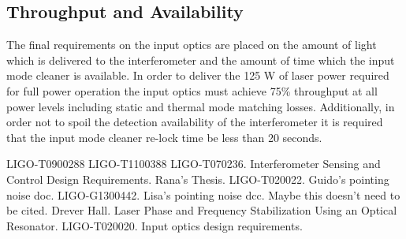 \documentclass[10pt]{article}
\begin{document}
\subsection{Throughput and Availability}
The final requirements on the input optics are placed on the amount of light which is delivered 
to the interferometer and the amount of time which the input mode cleaner is available.  
In order to deliver the 125 W of laser power required for full power operation the input optics 
must achieve 75\% throughput at all power levels including static and thermal mode matching losses.  
Additionally, in order not to spoil the detection availability of the interferometer 
it is required that the input mode cleaner re-lock time be less than 20 seconds.  

















\begin{thebibliography}{9}
		LIGO-T0900288
		LIGO-T1100388	
	  LIGO-T070236.  Interferometer Sensing and Control Design Requirements.
		Rana's Thesis.  
		LIGO-T020022. Guido's pointing noise doc.
		LIGO-G1300442. Lisa's pointing noise dcc. Maybe this doesn't need to be cited.  
		Drever Hall.  Laser Phase and Frequency Stabilization Using an Optical Resonator.		
		LIGO-T020020. Input optics design requirements.	
\end{thebibliography}
\end{document}
